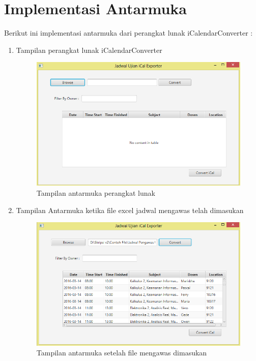 \section{Implementasi Antarmuka}
Berikut ini implementasi antarmuka dari perangkat lunak iCalendarConverter :
\begin{enumerate}
	\item Tampilan perangkat lunak iCalendarConverter
		\begin{figure}[H]
		\centering
		\includegraphics[scale=0.7]{Gambar/implementAntarmuka}
		\caption{Tampilan antarmuka perangkat lunak}
		\label{fig:implementAntarmuka}
		\end{figure}
	\item Tampilan Antarmuka ketika file excel jadwal mengawas telah dimasukan
		\begin{figure}[H]
		\centering
		\includegraphics[scale=0.7]{Gambar/implementAntarmuka2}
		\caption{Tampilan antarmuka setelah file mengawas dimasukan}
		\label{fig:implementAntarmuka}
		\end{figure}
\end{enumerate}

